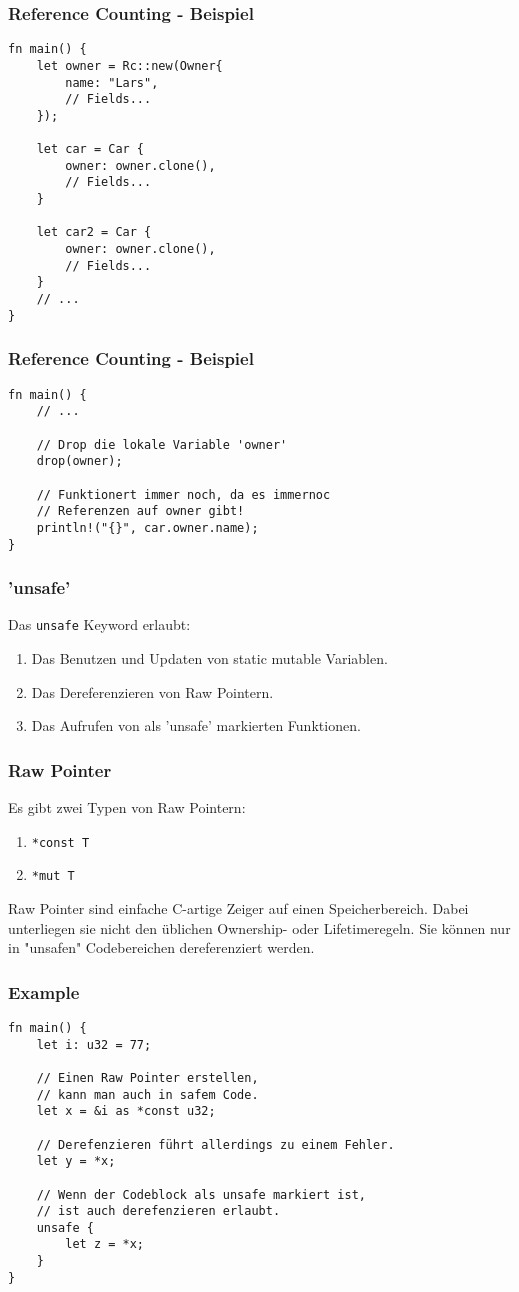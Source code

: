 \documentclass{beamer}
\begin{document}
\begin{frame}[fragile]
	\frametitle{Reference Counting - Beispiel}
	\begin{verbatim}
fn main() {
	let owner = Rc::new(Owner{
		name: "Lars",
		// Fields...
	});

	let car = Car {
		owner: owner.clone(),
		// Fields...
	}

	let car2 = Car {
		owner: owner.clone(),
		// Fields...
	}
	// ...
}
	\end{verbatim}
\end{frame}
\begin{frame}[fragile]
	\frametitle{Reference Counting - Beispiel}
	\begin{verbatim}
fn main() {
	// ...

	// Drop die lokale Variable 'owner'
	drop(owner);

	// Funktionert immer noch, da es immernoc
	// Referenzen auf owner gibt!
	println!("{}", car.owner.name);
}
	\end{verbatim}
\end{frame}

\begin{frame}
	\frametitle{'unsafe'}
	Das \texttt{unsafe} Keyword erlaubt:
	\begin{enumerate}
		\item Das Benutzen und Updaten von static mutable Variablen.
		\item Das Dereferenzieren von Raw Pointern.
		\item Das Aufrufen von als 'unsafe' markierten Funktionen.
	\end{enumerate}
\end{frame}
\begin{frame}[fragile]
	\frametitle{Raw Pointer}
	Es gibt zwei Typen von Raw Pointern:
	\begin{enumerate}
		\item \texttt{*const T}
		\item \texttt{*mut T}
	\end{enumerate}
	\vspace{1cm}
	Raw Pointer sind einfache C-artige Zeiger auf einen Speicherbereich. Dabei unterliegen sie nicht den üblichen Ownership- oder Lifetimeregeln. Sie können nur in "unsafen" Codebereichen dereferenziert werden.
\end{frame}
\begin{frame}[fragile]
	\frametitle{Example}
	\begin{verbatim}
fn main() {
	let i: u32 = 77;

	// Einen Raw Pointer erstellen,
	// kann man auch in safem Code.
	let x = &i as *const u32;

	// Derefenzieren führt allerdings zu einem Fehler.
	let y = *x;

	// Wenn der Codeblock als unsafe markiert ist,
	// ist auch derefenzieren erlaubt.
	unsafe {
		let z = *x;
	}
}
	\end{verbatim}
\end{frame}
\end{document}
